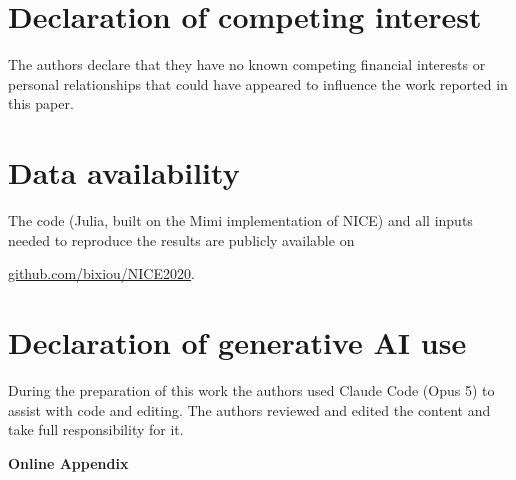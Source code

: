 \documentclass[12pt,english]{article}
\newif\ifblind
\theoremstyle{remark}
\newcommand{\competinginterests}{The authors declare that they have no known competing financial interests or personal relationships that could have appeared to influence the work reported in this paper.}
\begin{document}
\section*{Declaration of competing interest}
\competinginterests

\section*{Data availability}

The code (Julia, built on the Mimi implementation of NICE) and all inputs needed to reproduce the results are publicly available on 
\ifblind
[anonymised for review]
\else
\href{https://github.com/bixiou/NICE2020/tree/main/cap_and_share}{github.com/bixiou/NICE2020}.
\fi

\section*{Declaration of generative AI use}
During the preparation of this work the authors used Claude Code (Opus 5) to assist with code and editing. The authors reviewed and edited the content and take full responsibility for it.

\singlespacing
\ifblind
  
\else
  
\fi

\clearpage
\appendix
\nolinenumbers
\setcounter{table}{0}
\renewcommand{\thetable}{A\arabic{table}}
\setcounter{figure}{0}
\renewcommand{\thefigure}{A\arabic{figure}}
\begin{center}\Large\bfseries Online Appendix\end{center}


\end{document}
